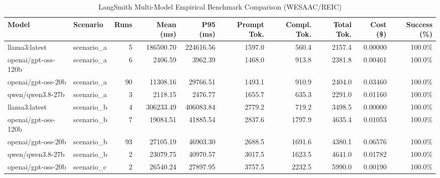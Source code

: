 \begin{table}[htbp]
\centering
\caption{LangSmith Multi-Model Empirical Benchmark Comparison (WESAAC/REIC)}
\label{tab:langsmith_metrics_comparison}
\begin{tabular}{llrrrrrrrr}
\toprule
\textbf{Model} & \textbf{Scenario} & \textbf{Runs} & \textbf{Mean (ms)} & \textbf{P95 (ms)} & \textbf{Prompt Tok.} & \textbf{Compl. Tok.} & \textbf{Total Tok.} & \textbf{Cost (\$)} & \textbf{Success (\%)} \\
\midrule
llama3:latest & scenario\_a & 5 & 186500.70 & 224616.56 & 1597.0 & 560.4 & 2157.4 & 0.00000 & 100.0\% \\
openai/gpt-oss-120b & scenario\_a & 6 & 2406.59 & 3962.39 & 1468.0 & 913.8 & 2381.8 & 0.00461 & 100.0\% \\
openai/gpt-oss-20b & scenario\_a & 90 & 11308.16 & 29766.51 & 1493.1 & 910.9 & 2404.0 & 0.03460 & 100.0\% \\
qwen/qwen3.8-27b & scenario\_a & 3 & 2118.15 & 2476.77 & 1655.7 & 635.3 & 2291.0 & 0.01160 & 100.0\% \\
llama3:latest & scenario\_b & 4 & 306233.49 & 406083.84 & 2779.2 & 719.2 & 3498.5 & 0.00000 & 100.0\% \\
openai/gpt-oss-120b & scenario\_b & 7 & 19084.51 & 41885.54 & 2837.6 & 1797.9 & 4635.4 & 0.01053 & 100.0\% \\
openai/gpt-oss-20b & scenario\_b & 93 & 27105.19 & 46903.30 & 2688.5 & 1691.6 & 4380.1 & 0.06576 & 100.0\% \\
qwen/qwen3.8-27b & scenario\_b & 2 & 23079.75 & 40970.57 & 3017.5 & 1623.5 & 4641.0 & 0.01782 & 100.0\% \\
openai/gpt-oss-20b & scenario\_c & 2 & 26540.24 & 27897.95 & 3757.5 & 2232.5 & 5990.0 & 0.00190 & 100.0\% \\
\bottomrule
\end{tabular}
\end{table}
